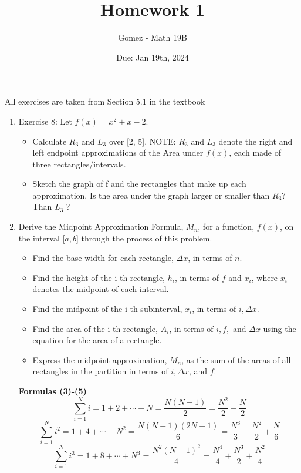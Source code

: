 \documentclass[11pt]{article}
\title{Homework 1}
\author{Gomez - Math 19B}
\date{Due: Jan 19th, 2024}
\begin{document}
\maketitle

\noindent 
\normalsize
All exercises are taken from Section 5.1 in the textbook

\begin{enumerate}
\item 
Exercise 8:
Let $f(x) = x^2 + x - 2$.
\begin{itemize}
\item Calculate $R_3$ and $L_3$ over [2, 5]. NOTE: $R_3$ and $L_3$ denote the right and left endpoint approximations of the Area under $f(x)$, each made of three rectangles/intervals. 
\item Sketch the graph of f and the rectangles that make up each approximation. Is the area under the graph larger or smaller than $R_3$?
Than $L_3$ ?
\end{itemize}

\item 
Derive the Midpoint Approximation Formula, $M_n$, for a function, $f(x)$, on the interval [$a, b$] through the process of this problem. 
\begin{itemize}
    \item Find the base width for each rectangle, $\Delta x$, in terms of $n$.

    \item Find the height of the i-th rectangle, $h_i$, in terms of $f$ and $x_i$, where $x_i$ denotes the midpoint of each interval.

    \item Find the midpoint of the i-th subinterval, $x_i$, in terms of $i, \Delta x$. 

    \item Find the area of the i-th rectangle, $A_i$, in terms of $i, f,$ and $\Delta x$ using the equation for the area of a rectangle.

    \item Express the midpoint approximation, $M_n$, as the sum of the areas of all rectangles in the partition in terms of $i, \Delta x$, and $f$.
\end{itemize}


\setcounter{equation}{2}
\textbf{Formulas (3)-(5)}
\begin{equation}
    \sum_{i=1}^Ni = 1 + 2 + \cdots + N = \frac{N(N+1)}{2} = \frac{N^2}{2} + \frac{N}{2}
\end{equation}
\begin{equation}
    \sum_{i=1}^Ni^2 = 1 + 4 + \cdots + N^2 = \frac{N(N+1)(2N+1)}{6} = \frac{N^3}{3} + \frac{N^2}{2} + \frac{N}{6}
\end{equation}
\begin{equation}
    \sum_{i=1}^Ni^3 = 1 + 8 + \cdots + N^3 = \frac{N^2(N+1)^2}{4} = \frac{N^4}{4} + \frac{N^3}{2} + \frac{N^2}{4}
\end{equation}


\end{enumerate}
\end{document}
